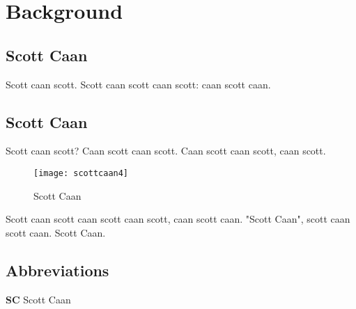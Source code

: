 \section{Background}

\subsection{Scott Caan}
	Scott caan scott. Scott caan scott caan scott: caan scott caan.
\subsection{Scott Caan}
	Scott caan scott? Caan scott caan scott. Caan scott caan scott, caan scott. 
\begin {figure}[htbp]
\centering
\texttt{[image: scottcaan4]}
\caption{Scott Caan}
\label{fig4}
\centering
\end{figure}

Scott caan scott caan scott caan scott, caan scott caan.\cite{caan3} "Scott Caan", scott caan scott caan. Scott Caan.
 

\subsection{Abbreviations}
\textbf{SC} Scott Caan
